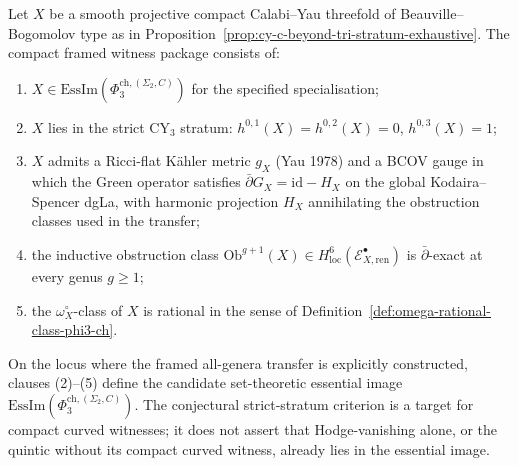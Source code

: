 \begin{conjecture}
\label{thm:phi3-ch-essential-image}
\ClaimStatusConjectured
Let $X$ be a smooth projective compact Calabi--Yau threefold of Beauville--Bogomolov type as in Proposition~\ref{prop:cy-c-beyond-tri-stratum-exhaustive}. The compact framed witness package consists of:
\begin{enumerate}[label=\textup{(\arabic*)}]
\item $X \in \mathrm{EssIm}(\Phi_3^{\mathrm{ch},(\Sigma_2,C)})$ for the specified specialisation;
\item $X$ lies in the strict CY$_3$ stratum: $h^{0,1}(X) = h^{0,2}(X) = 0$, $h^{0,3}(X) = 1$;
\item $X$ admits a Ricci-flat K\"ahler metric $g_X$ (Yau 1978) and a BCOV gauge in which the Green operator satisfies $\bar\partial G_X = \mathrm{id} - H_X$ on the global Kodaira--Spencer dgLa, with harmonic projection $H_X$ annihilating the obstruction classes used in the transfer;
\item the inductive obstruction class $\mathrm{Ob}^{g+1}(X) \in H^6_{\mathrm{loc}}(\mathcal{E}^\bullet_{X, \mathrm{ren}})$ is $\bar\partial$-exact at every genus $g \geq 1$;
\item the $\omega_X^\circ$-class of $X$ is rational in the sense of Definition~\ref{def:omega-rational-class-phi3-ch}.
\end{enumerate}
On the locus where the framed all-genera transfer is explicitly
constructed, clauses \textup{(2)--(5)} define the candidate set-theoretic
essential image
$\mathrm{EssIm}(\Phi_3^{\mathrm{ch},(\Sigma_2,C)})$. The conjectural
strict-stratum criterion is a target for compact curved witnesses; it
does not assert that Hodge-vanishing alone, or the quintic without its
compact curved witness, already lies in the essential image.
\end{conjecture}

